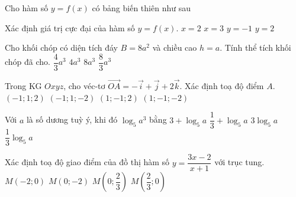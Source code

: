 \begin{ex}%
	Cho hàm số $y=f(x)$ có bảng biến thiên như sau
	\begin{center}
	\end{center}
	Xác định giá trị cực đại của hàm số $y=f(x)$.
	\choice
	{$x=2$}
	{$x=3$}
	{$y=-1$}
	{\True $y=2$}
\end{ex}
\begin{ex}%
	Cho khối chóp có diện tích đáy $B=8a^2$ và chiều cao $h=a$. Tính thể tích khối chóp đã cho.
	\choice
	{$\dfrac{4}{3}a^3$}
	{$4a^3$}
	{$8a^3$}
	{\True $\dfrac{8}{3}a^3$}
\end{ex}
\begin{ex}%
	Trong KG $Oxyz$, cho véc-tơ $\overrightarrow{OA}=-\vec{i}+\vec{j}+2\vec{k}$. Xác định toạ độ điểm $A$.
	\choice
	{\True $(-1;1;2)$}
	{$(-1;1;-2)$}
	{$(1;-1;2)$}
	{$(1;-1;-2)$}
\end{ex}
\begin{ex}%
	Với $a$ là số dương tuỳ ý, khi đó $\log_5 a^3$ bằng
	\choice
	{$3+\log_5 a$}
	{$\dfrac{1}{3}+\log_5 a$}
	{\True $3 \log_5 a$}
	{$\dfrac{1}{3} \log_5 a$}
\end{ex}
\begin{ex}%
	Xác định toạ độ giao điểm của đồ thị hàm số $y=\dfrac{3x-2}{x+1}$ với trục tung.
	\choice
	{$M(-2;0)$}
	{\True $M(0;-2)$}
	{$M\left(0;\dfrac{2}{3}\right)$}
	{$M\left(\dfrac{2}{3};0\right)$}
\end{ex}
